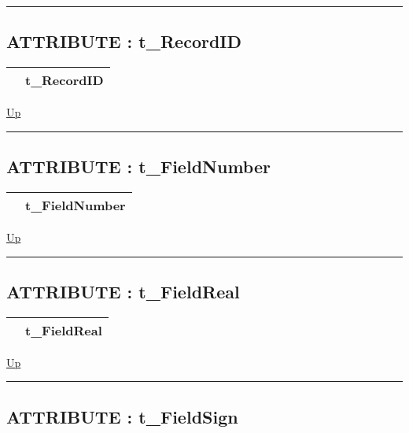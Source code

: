 \rule{\textwidth}{0.4pt}

\subsection*{ATTRIBUTE : t\_RecordID}
\hypertarget{ecldoc:ml_core.types.t_recordid}{}

{\renewcommand{\arraystretch}{1.5}
\begin{tabularx}{\textwidth}{|>{\raggedright\arraybackslash}l|X|}
\hline
\hspace{0pt} & t\_RecordID \\
\hline
\end{tabularx}
}

\hyperlink{ecldoc:ML_Core.Types}{Up}

\par


\rule{\textwidth}{0.4pt}
\subsection*{ATTRIBUTE : t\_FieldNumber}
\hypertarget{ecldoc:ml_core.types.t_fieldnumber}{}

{\renewcommand{\arraystretch}{1.5}
\begin{tabularx}{\textwidth}{|>{\raggedright\arraybackslash}l|X|}
\hline
\hspace{0pt} & t\_FieldNumber \\
\hline
\end{tabularx}
}

\hyperlink{ecldoc:ML_Core.Types}{Up}

\par


\rule{\textwidth}{0.4pt}
\subsection*{ATTRIBUTE : t\_FieldReal}
\hypertarget{ecldoc:ml_core.types.t_fieldreal}{}

{\renewcommand{\arraystretch}{1.5}
\begin{tabularx}{\textwidth}{|>{\raggedright\arraybackslash}l|X|}
\hline
\hspace{0pt} & t\_FieldReal \\
\hline
\end{tabularx}
}

\hyperlink{ecldoc:ML_Core.Types}{Up}

\par


\rule{\textwidth}{0.4pt}
\subsection*{ATTRIBUTE : t\_FieldSign}
\hypertarget{ecldoc:ml_core.types.t_fieldsign}{}

